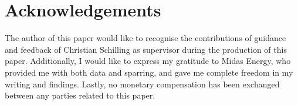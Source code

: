 \section{Acknowledgements}
The author of this paper would like to recognise 
the
contributions of guidance and feedback of Christian Schilling
as supervisor during the production of this paper. Additionally,
I would like to express my gratitude to Midas Energy, who
provided me with both data and sparring, and gave me complete
freedom in my writing and findings. Lastly, no monetary
compensation has been exchanged between any parties related
to this paper.
